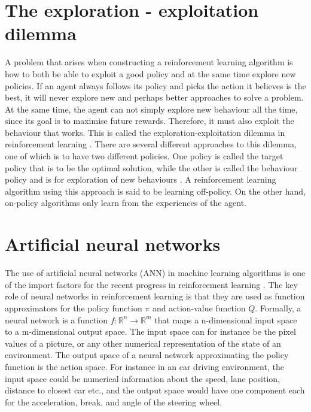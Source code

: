 \documentclass[class=book, crop=false, 11pt]{standalone}
\begin{document}
\section{The exploration - exploitation dilemma}
A problem that arises when constructing a reinforcement learning algorithm is how to both be able to exploit a good policy and at the same time explore new policies. If an agent always follows its policy and picks the action it believes is the best, it will never explore new and perhaps better approaches to solve a problem. At the same time, the agent can not simply explore new behaviour all the time, since its goal is to maximise future rewards. Therefore, it must also exploit the behaviour that works. This is called the exploration-exploitation dilemma in reinforcement learning \cite{Sutton1998}. There are several different approaches to this dilemma, one of which is to have two different policies. One policy is called the target policy that is to be the optimal solution, while the other is called the behaviour policy and is for exploration of new behaviours \cite{Sutton1998}. A reinforcement learning algorithm using this approach is said to be learning off-policy. On the other hand, on-policy algorithms only learn from the experiences of the agent.

\section{Artificial neural networks}
The use of artificial neural networks (ANN) in machine learning algorithms is one of the import factors for the recent progress in reinforcement learning \cite{Sutton1998}. The key role of neural networks in reinforcement learning is that they are used as function approximators for the policy function $\pi$ and action-value function $Q$. Formally, a neural network is a function $f: \mathbb{R}^{n} \to \mathbb{R}^{m}$ that maps a n-dimensional input space to a m-dimensional output space. The input space can for instance be the pixel values of a picture, or any other numerical representation of the state of an environment. The output space of a neural network approximating the policy function is the action space. For instance in an car driving environment, the input space could be numerical information about the speed, lane position, distance to closest car etc., and the output space would have one component each for the acceleration, break, and angle of the steering wheel.
\end{document}
